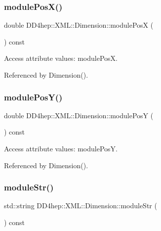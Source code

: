 \subsubsection{\texorpdfstring{module\+Pos\+X()}{modulePosX()}}
{\footnotesize\ttfamily double D\+D4hep\+::\+X\+M\+L\+::\+Dimension\+::module\+PosX (\begin{DoxyParamCaption}{ }\end{DoxyParamCaption}) const}



Access attribute values\+: module\+PosX. 



Referenced by Dimension().

\hypertarget{struct_d_d4hep_1_1_x_m_l_1_1_dimension_afacf7a51cee20fe109a53eda5c8a0ead}{}\label{struct_d_d4hep_1_1_x_m_l_1_1_dimension_afacf7a51cee20fe109a53eda5c8a0ead} 
\subsubsection{\texorpdfstring{module\+Pos\+Y()}{modulePosY()}}
{\footnotesize\ttfamily double D\+D4hep\+::\+X\+M\+L\+::\+Dimension\+::module\+PosY (\begin{DoxyParamCaption}{ }\end{DoxyParamCaption}) const}



Access attribute values\+: module\+PosY. 



Referenced by Dimension().

\hypertarget{struct_d_d4hep_1_1_x_m_l_1_1_dimension_ab305c3d384b6227b414e5cb8cd0d061a}{}\label{struct_d_d4hep_1_1_x_m_l_1_1_dimension_ab305c3d384b6227b414e5cb8cd0d061a} 
\subsubsection{\texorpdfstring{module\+Str()}{moduleStr()}}
{\footnotesize\ttfamily std\+::string D\+D4hep\+::\+X\+M\+L\+::\+Dimension\+::module\+Str (\begin{DoxyParamCaption}{ }\end{DoxyParamCaption}) const}



